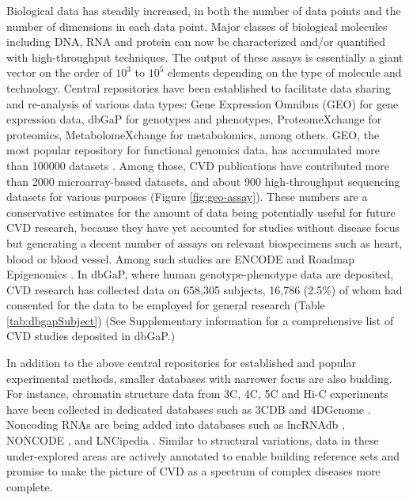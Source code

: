 \documentclass[letter]{bioinfo}
\begin{document}
	Biological data has steadily increased, in both the number of data points and the number of dimensions in each data point.
	Major classes of biological molecules including DNA, RNA and protein can now be characterized and/or quantified with high-throughput techniques. The output of these assays is essentially a giant vector on the order of $10^3$ to $10^5$ elements depending on the type of molecule and technology.
	Central repositories have been established to facilitate data sharing and re-analysis of various data types: Gene Expression Omnibus (GEO) \citep{Barrett:2013:NCBI} for gene expression data, dbGaP \citep{Tryka:2014:dbGaP} for genotypes and phenotypes, ProteomeXchange \citep{Vizcaino:2014:ProteomeXchange,Deutsch:2017:ProteomeXchange} for proteomics, MetabolomeXchange for metabolomics, among others.
	GEO, the most popular repository for functional genomics data, has accumulated more than 100000 datasets \citep{Zhu:2008:GEOmetadb}. Among those, CVD publications have contributed more than 2000 microarray-based datasets, and about 900 high-throughput sequencing datasets for various purposes (Figure \ref{fig:geo-assay}). These numbers are a conservative estimates for the amount of data being potentially useful for future CVD research, because they have yet accounted for studies without disease focus but generating a decent number of assays on relevant biospecimens such as heart, blood or blood vessel. Among such studies are ENCODE \citep{ENCODE:2012:integrated} and Roadmap Epigenomics \citep{Roadmap:2015:Integrative}.
	In dbGaP, where human genotype-phenotype data are deposited, CVD research has collected data on 658,305 subjects, 16,786 (2.5\%) of whom had consented for the data to be employed for general research (Table \ref{tab:dbgapSubject}) (See Supplementary information for a comprehensive list of CVD studies deposited in dbGaP.)
	
	In addition to the above central repositories for established and popular experimental methods, smaller databases with narrower focus are also budding. For instance, chromatin structure data from 3C, 4C, 5C and Hi-C experiments have been collected in dedicated databases such as 3CDB \citep{Yun:2016:3CDB} and 4DGenome \citep{Teng:2015:4DGenome}. Noncoding RNAs are being added into databases such as lncRNAdb \citep{Quek:2015:lncRNAdb}, NONCODE \citep{Fang:2018:NONCODEV5}, and LNCipedia \citep{Volders:2018:LNCipedia}.  Similar to structural variations, data in these under-explored areas are actively annotated to enable building reference sets and promise to make the picture of CVD as a spectrum of complex diseases more complete.
\end{document}
